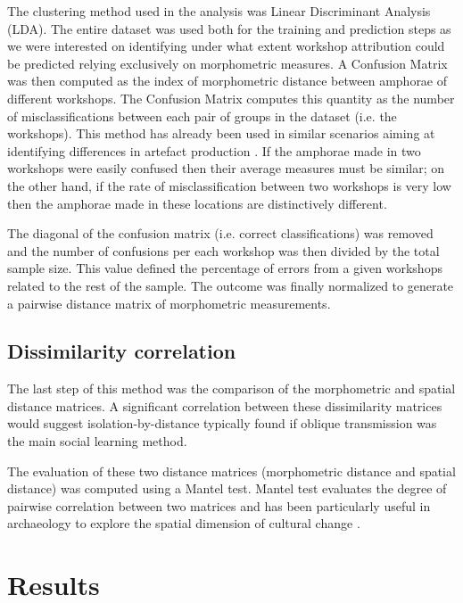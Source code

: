 \documentclass[review]{elsarticle}
\begin{document}
The clustering method used in the analysis was Linear Discriminant Analysis (LDA). The entire dataset was used both for the training and prediction steps as we were interested on identifying under what extent workshop attribution could be predicted relying exclusively on morphometric measures. A Confusion Matrix was then computed as the index of morphometric distance between amphorae of different workshops. The Confusion Matrix computes this quantity as the number of misclassifications between each pair of groups in the dataset (i.e. the workshops). This method has already been used in similar scenarios aiming at identifying differences in artefact production \citep{thorpe_distribution_1984,i_martin_alisis_1998,charlton_investigating_2012}. If the amphorae made in two workshops were easily confused then their average measures must be similar; on the other hand, if the rate of misclassification between two workshops is very low then the amphorae made in these locations are distinctively different.

The diagonal of the confusion matrix (i.e. correct classifications) was removed and the number of confusions per each workshop was then divided by the total sample size. This value defined the percentage of errors from a given workshops related to the rest of the sample. The outcome was finally normalized to generate a pairwise distance matrix of morphometric measurements.

\subsection{Dissimilarity correlation}

The last step of this method was the comparison of the morphometric and spatial distance matrices. A significant correlation between these dissimilarity matrices would suggest isolation-by-distance typically found if oblique transmission was the main social learning method.

The evaluation of these two distance matrices (morphometric distance and spatial distance) was computed using a Mantel test. Mantel test evaluates the degree of pairwise correlation between two matrices and has been particularly useful in archaeology to explore the spatial dimension of cultural change \citep{mantel_detection_1967, diniz-filho_mantel_2013, crema_culture_2014}.  

\section{Results}
\end{document}
